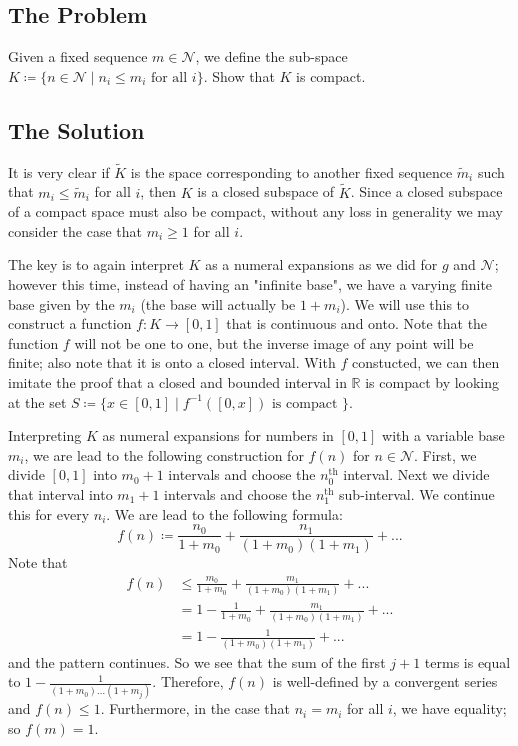 \subsection*{The Problem}
Given a fixed sequence \(m \in \mathcal N\), we define the sub-space
\(K \coloneqq \{n\in\mathcal N \mid n_i \leq m_i \text{ for all } i\}\). Show that \(K\) is compact.

\subsection*{The Solution}

It is very clear if \(\tilde K\) is the space corresponding to another fixed sequence \(\tilde m_i\) such that
\(m_i \leq \tilde m_i\) for all \(i\), then \(K\) is a closed subspace of \(\tilde K\). Since a
closed subspace of a compact
space must also be compact, without any loss in generality we may consider the case that \(m_i \geq 1\)
for all \(i\).

The key is to again interpret \(K\) as a numeral expansions as we did for \(g\) and \(\mathcal N\); however
this time, instead of having an "infinite base", we have a varying finite base given by the \(m_i\) (the base
will actually be \(1 + m_i\)). We will
use this to construct a function \(f: K \to [0, 1]\) that is continuous and onto. Note that the function
\(f\) will not be one to one, but the inverse image of any point will be finite; also note that it is
onto a closed interval. With \(f\) constucted, we can then imitate the proof
that a closed and bounded interval in \(\mathbb R\) is compact by looking at the set 
\(S \coloneqq \{x\in [0,1] \mid f^{-1}([0, x]) \text{ is compact }\}\). 

Interpreting \(K\) as numeral expansions for numbers in \([0, 1]\) with a variable base \(m_i\), we are lead
to the following construction for \(f(n)\) for \(n \in \mathcal N\). First, we divide \([0, 1]\)
into \(m_0 + 1\) intervals and choose the \(n_0^{\text{th}}\) interval. Next we divide that interval into
\(m_1  + 1\) intervals and choose the \(n_1^{\text{th}}\) sub-interval. We continue this for every \(n_i\).
We are lead to the following formula:
\begin{equation}
f(n) \coloneqq \frac{n_0}{1 + m_0} + \frac{n_1}{(1+m_0)(1+m_1)} + ...
\end{equation}
Note that
\begin{align}
f(n) & \leq \frac{m_0}{1 + m_0} + \frac{m_1}{(1 + m_0)(1 + m_1)} + ... \\
    & = 1 - \frac{1}{1+m_0} + \frac{m_1}{(1 + m_0)(1 + m_1)} + ... \\
    & = 1 - \frac{1}{(1+m_0)(1+m_1)} + ...
\end{align}
and the pattern continues. So we see that the sum of the first \(j+1\) terms is equal to
\(1 - \frac{1}{(1 + m_0)...(1+m_j)}\). Therefore, \(f(n)\) is well-defined by a convergent series and
\(f(n) \leq 1\). Furthermore, in the case that \(n_i = m_i\) for all \(i\), we have equality; so
\(f(m) = 1\). 

